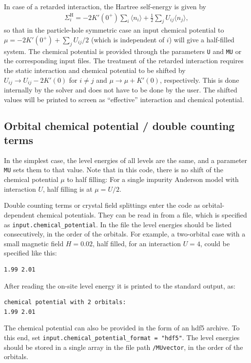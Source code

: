 \documentclass[aps,prb,floatfix,superscriptaddress,twocolumn,notitlepage]{revtex4-1}
\begin{document}
In case of a retarded interaction, the Hartree self-energy is given by
\begin{align}
\Sigma^{\text{H}}_{i} = - 2K'(0^{+})\sum_{i}\langle n_{i}\rangle +\frac{1}{2}\sum_{j}U_{ij}\langle n_{j}\rangle ,
\end{align}
so that in the particle-hole symmetric case an input chemical potential to $\mu=-2K'(0^{+})+\sum_{j}U_{ij}/2$ (which is independent of $i$) will give a half-filled system. The chemical potential is provided through the parameters \verb#U# and \verb#MU# or the corresponding input files.
The treatment of the retarded interaction requires the static interaction and chemical potential to be shifted by $U_{ij}\to U_{ij}-2K'(0)$ for $i\neq j$ and $\mu\to \mu+K'(0)$, respectively. This is done internally by the solver and does not have to be done by the user. The shifted values will be printed to screen as ``effective'' interaction and chemical potential.

\subsection{Orbital chemical potential / double counting terms}
\label{sec:mu}
In the simplest case, the level energies of all levels are the same, and a parameter \verb#MU# sets them to that value. Note that in this code, there is no shift of the chemical potential $\mu$ to half filling: For a single impurity Anderson model with interaction $U$, half filling is at $\mu=U/2$.

Double counting terms or crystal field splittings enter the code as orbital-dependent chemical potentials. They can be read in from a file, which is specified as \verb#input.chemical_potential#. In the file the level energies should be listed consecutively, in the order of the orbitals. For example, a two-orbital case with a small magnetic field $H=0.02$, half filled, for an interaction $U=4$, could be specified like this:
\begin{verbatim}
1.99 2.01
\end{verbatim}
After reading the on-site level energy it is printed to the standard output, as:
\begin{verbatim}
chemical potential with 2 orbitals: 
1.99 2.01 
\end{verbatim}
The chemical potential can also be provided in the form of an hdf5 archive. To this end, set \verb#input.chemical_potential_format = "hdf5"#. The level energies should be stored in a single array in the file path \verb#/MUvector#, in the order of the orbitals.
\end{document}
